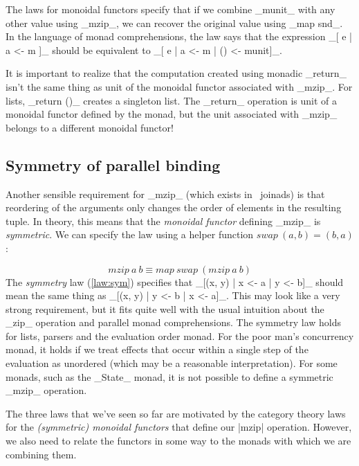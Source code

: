 \documentclass{tmr}
\newcommand{\map}[2]{\mathit{map}\ #1\ #2}
\newcommand{\mzip}[2]{\mathit{mzip}\ #1\ #2}
\newcommand{\swap}{\mathit{swap}}
\begin{document}
The laws for monoidal functors specify that if we combine _munit_ with any other value using _mzip_, 
we can recover the original value using _map snd_. In the language
of monad comprehensions, the law says that the expression _[ e | a <- m ]_ should be equivalent to
_[ e | a <- m | () <- munit]_. 

It is important to realize that the computation created using monadic _return_ isn't the same thing 
as unit of the monoidal functor associated with _mzip_. For lists, _return ()_ creates a singleton 
list. The _return_ operation is unit of a monoidal functor defined by the monad, but the unit 
associated with _mzip_ belongs to a different monoidal functor!


\subsection{Symmetry of parallel binding}

Another sensible requirement for _mzip_ (which exists in \fsharp \ joinads) is that reordering of 
the arguments only changes the order of elements in the resulting tuple. In theory, this means that 
the \textit{monoidal functor} defining _mzip_ is \textit{symmetric}. We can specify the law using a 
helper function $\swap\ (a,b) = (b,a)$:

\begin{equation}
  \mzip a b \equiv \map \swap {(\mzip a b)}
  \label{law:sym}
\end{equation}
The \textit{symmetry} law (\ref{law:sym}) specifies that _[(x, y) | x <- a | y <- b]_ should mean 
the same thing as _[(x, y) | y <- b | x <- a]_. This may look like a very strong requirement, but 
it fits quite well with the usual intuition about the _zip_ operation and parallel monad 
comprehensions. The symmetry law holds for lists, parsers and the
evaluation order monad. For the poor 
man's concurrency monad, it holds if we treat effects that occur within a single step of the 
evaluation as unordered (which may be a reasonable interpretation). For some monads, such as the
_State_ monad, it is not possible to define a symmetric _mzip_ operation. 

\UndefineShortVerb{\_}
\DefineShortVerb{\|}

The three laws that we've seen so far are motivated by the category theory laws for
the \textit{(symmetric) monoidal functors} that define our |mzip| 
operation. However, we also need to relate the functors in some way to
the monads with which we are combining them.
\end{document}
